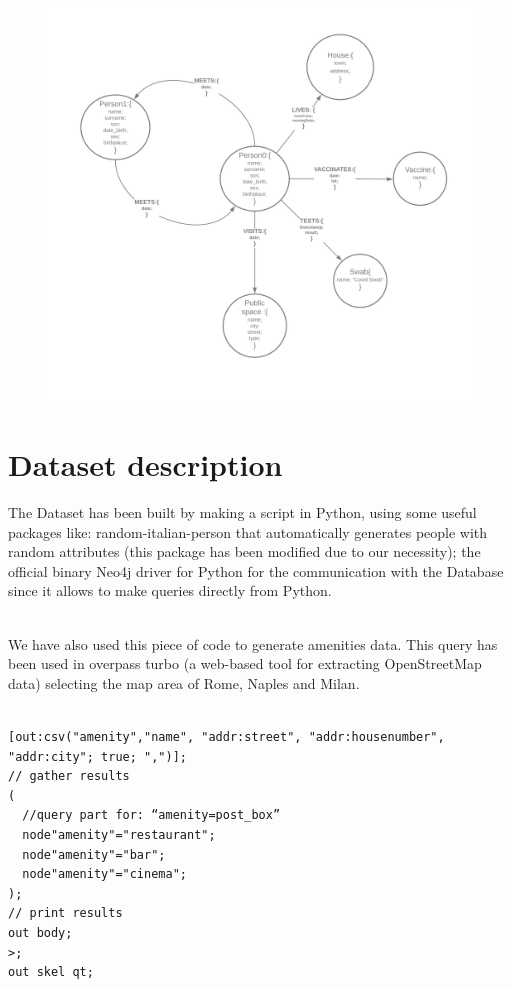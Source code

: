 \documentclass{article}
\begin{document}
\begin{figure} [h]
\centering
\includegraphics[scale=0.15]{Graph_diagram.png}
\end{figure}
\newpage

\section{Dataset description}
The Dataset has been built by making a script in Python, using some useful packages like: random-italian-person that automatically generates people with random attributes (this package has been modified due to our necessity); the official binary Neo4j driver for Python for the communication with the Database since it allows to make queries directly from Python.

\\
\hfill\break
We have also used this piece of code to generate amenities data. This query has been used in overpass turbo (a web-based tool for extracting OpenStreetMap data) selecting the map area of Rome, Naples and Milan.

\begin{lstlisting}[language=cypher, label=lst:cypher-example]

[out:csv("amenity","name", "addr:street", "addr:housenumber", "addr:city"; true; ",")];
// gather results
(
  //query part for: “amenity=post_box”
  node"amenity"="restaurant";
  node"amenity"="bar";
  node"amenity"="cinema";
);
// print results
out body;
>;
out skel qt;
\end{lstlisting}
\newpage
\end{document}
